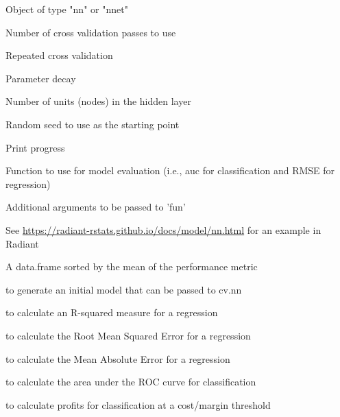\documentclass[a4paper]{book}
\begin{document}
\begin{Arguments}
\begin{ldescription}
\item[\code{object}] Object of type "nn" or "nnet"

\item[\code{K}] Number of cross validation passes to use

\item[\code{repeats}] Repeated cross validation

\item[\code{decay}] Parameter decay

\item[\code{size}] Number of units (nodes) in the hidden layer

\item[\code{seed}] Random seed to use as the starting point

\item[\code{trace}] Print progress

\item[\code{fun}] Function to use for model evaluation (i.e., auc for classification and RMSE for regression)

\item[\code{...}] Additional arguments to be passed to 'fun'
\end{ldescription}
\end{Arguments}
%
\begin{Details}
See \url{https://radiant-rstats.github.io/docs/model/nn.html} for an example in Radiant
\end{Details}
%
\begin{Value}
A data.frame sorted by the mean of the performance metric
\end{Value}
%
\begin{SeeAlso}
 to generate an initial model that can be passed to cv.nn

 to calculate an R-squared measure for a regression

 to calculate the Root Mean Squared Error for a regression

 to calculate the Mean Absolute Error for a regression

 to calculate the area under the ROC curve for classification

 to calculate profits for classification at a cost/margin threshold
\end{SeeAlso}
\end{document}
